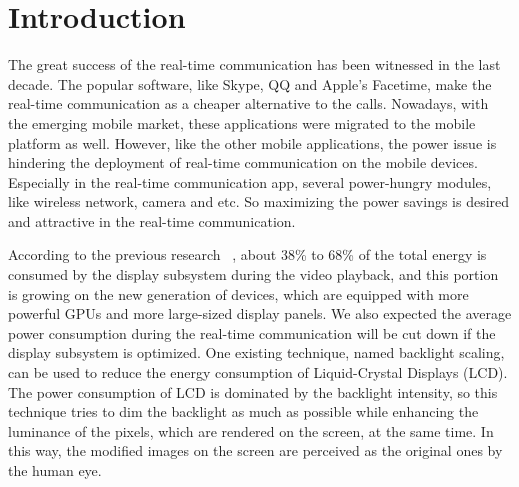 \section{Introduction}


The great success of the real-time communication has been witnessed in
the last decade. The popular software, like Skype, QQ and Apple's
Facetime, make the real-time communication as a cheaper alternative to
the calls. Nowadays, with the emerging mobile market, these
applications were migrated to the mobile platform as well. However,
like the other mobile applications, the power issue is hindering the
deployment of real-time communication on the mobile
devices. Especially in the real-time communication app, several
power-hungry modules, like wireless network, camera and etc. So
maximizing the power savings is desired and attractive in the
real-time communication.


According to the previous research ~\cite{AG10}, about 38\% to 68\% of the
total energy is consumed by the display subsystem during the video
playback, and this portion is growing on the new generation of
devices, which are equipped with more powerful GPUs and more
large-sized display panels. We also expected the average power
consumption during the real-time communication will be cut down if the
display subsystem is optimized. One existing technique, named
backlight scaling, can be used to reduce the energy consumption of
Liquid-Crystal Displays (LCD). The power consumption of LCD is
dominated by the backlight intensity, so this technique tries to dim
the backlight as much as possible while enhancing the luminance of the
pixels, which are rendered on the screen, at the same time. In this
way, the modified images on the screen are perceived as the original
ones by the human eye.  



